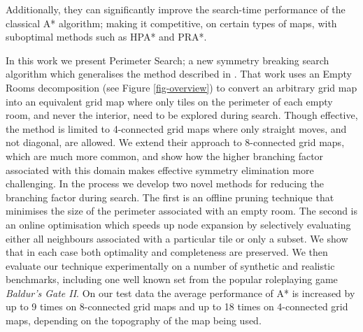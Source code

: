 Additionally, they can significantly improve the search-time performance of the classical A* algorithm; making it competitive,
on certain types of maps, with suboptimal methods such as HPA* and PRA*.
\par
In this work we present Perimeter Search; a new symmetry breaking search algorithm which generalises the method described in \cite{harabor10}.
That work uses an Empty Rooms decomposition (see Figure \ref{fig-overview}) to convert an arbitrary grid map into an
equivalent grid map where only tiles on the perimeter of each empty room, and never the interior, need to be explored during search. 
Though effective, the method is limited to 4-connected grid maps where only straight moves, and not diagonal, are
allowed.
We extend their approach to 8-connected grid maps, which are much more common, and show how the higher branching factor associated 
with this domain makes effective symmetry elimination more challenging.
In the process we develop two novel methods for reducing the branching factor during search.
The first is an offline pruning technique that minimises the size of the perimeter associated with an empty room.
The second is an online optimisation which speeds up node expansion by selectively evaluating either all neighbours
associated with a particular tile or only a subset.
We show that in each case both optimality and completeness are preserved.
We then evaluate our technique experimentally on a number of synthetic and realistic benchmarks, including one well known set 
from the popular roleplaying game \emph{Baldur's Gate II}.
On our test data the average performance of A* is increased by up to 9 times on 8-connected grid maps and up to
18 times on 4-connected grid maps, depending on the topography of the map being used.

